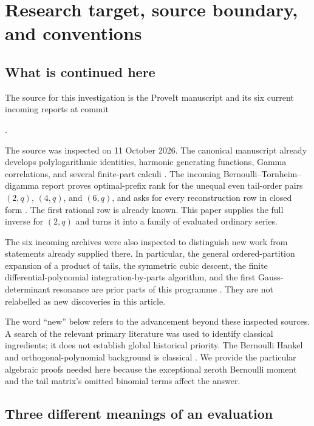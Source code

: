 \section{Research target, source boundary, and conventions}
\label{sec:scope}

\subsection{What is continued here}

The source for this investigation is the ProveIt manuscript and its six
current incoming reports at commit
\begin{center}\small\repoSHA.\end{center}
The source was inspected on 11 October 2026. The canonical manuscript
already develops polylogarithmic identities, harmonic generating
functions, Gamma correlations, and several finite-part calculi
\cite{repo}. The incoming Bernoulli--Tornheim--digamma report proves
optimal-prefix rank for the unequal even tail-order pairs $(2,q)$,
$(4,q)$, and $(6,q)$, and asks for every reconstruction row in closed
form \cite[research question R2]{incoming-bernoulli}. The first rational
row is already known. This paper supplies the full inverse for $(2,q)$
and turns it into a family of evaluated ordinary series.

The six incoming archives were also inspected to distinguish new work
from statements already supplied there. In particular, the general
ordered-partition expansion of a product of tails, the symmetric cubic
descent, the finite differential-polynomial integration-by-parts
algorithm, and the first Gauss-determinant resonance are prior parts of
this programme \cite{incoming-cubic,incoming-differential,
incoming-determinantal,incoming-tail,incoming-multishift}.
They are not relabelled as new discoveries in this article.

The word ``new'' below refers to the advancement beyond these inspected
sources. A search of the relevant primary literature was used to identify
classical ingredients; it does not establish global historical priority.
The Bernoulli Hankel and orthogonal-polynomial background is classical
\cite{dilcher-jiu,dlmf-op}. We provide the particular algebraic proofs
needed here because the exceptional zeroth Bernoulli moment and the
tail matrix's omitted binomial terms affect the answer.

\subsection{Three different meanings of an evaluation}

